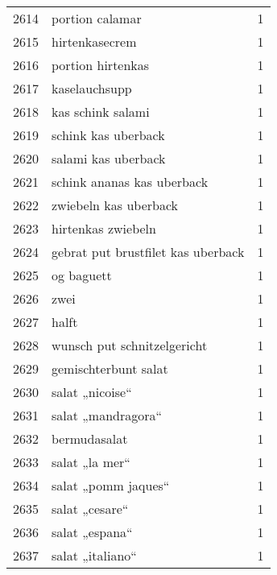 \begin{tabular}{llr}
2614 &                                    portion calamar &      1 \\
2615 &                                     hirtenkasecrem &      1 \\
2616 &                                  portion hirtenkas &      1 \\
2617 &                                      kaselauchsupp &      1 \\
2618 &                                  kas schink salami &      1 \\
2619 &                                schink kas uberback &      1 \\
2620 &                                salami kas uberback &      1 \\
2621 &                         schink ananas kas uberback &      1 \\
2622 &                              zwiebeln kas uberback &      1 \\
2623 &                                 hirtenkas zwiebeln &      1 \\
2624 &                 gebrat put brustfilet kas uberback &      1 \\
2625 &                                         og baguett &      1 \\
2626 &                                               zwei &      1 \\
2627 &                                              halft &      1 \\
2628 &                        wunsch put schnitzelgericht &      1 \\
2629 &                               gemischterbunt salat &      1 \\
2630 &                                    salat „nicoise“ &      1 \\
2631 &                                 salat „mandragora“ &      1 \\
2632 &                                       bermudasalat &      1 \\
2633 &                                     salat „la mer“ &      1 \\
2634 &                                salat „pomm jaques“ &      1 \\
2635 &                                     salat „cesare“ &      1 \\
2636 &                                     salat „espana“ &      1 \\
2637 &                                   salat „italiano“ &      1 \\

\end{tabular}

